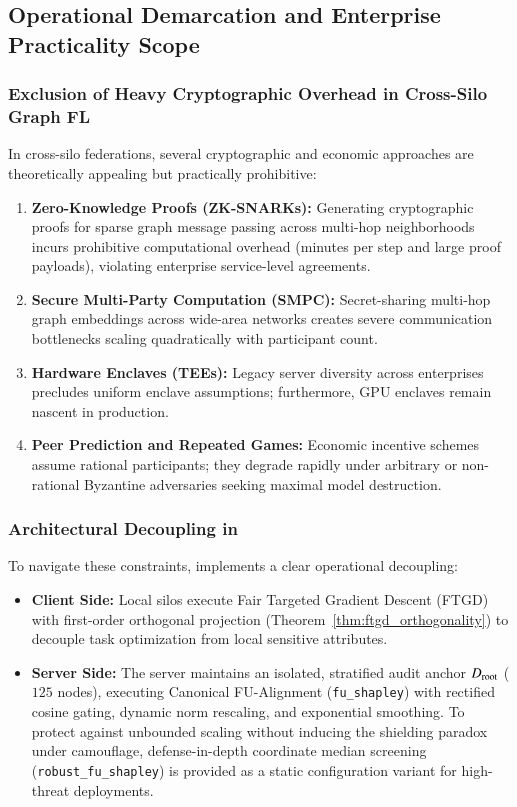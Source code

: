 \subsection{Operational Demarcation and Enterprise Practicality Scope}
\label{subsec:rw_scope}

\subsubsection{Exclusion of Heavy Cryptographic Overhead in Cross-Silo Graph FL}
In cross-silo federations, several cryptographic and economic approaches are theoretically appealing but practically prohibitive:
\begin{enumerate}[leftmargin=*]
    \item \textbf{Zero-Knowledge Proofs (ZK-SNARKs):} Generating cryptographic proofs for sparse graph message passing across multi-hop neighborhoods incurs prohibitive computational overhead (minutes per step and large proof payloads), violating enterprise service-level agreements.
    \item \textbf{Secure Multi-Party Computation (SMPC):} Secret-sharing multi-hop graph embeddings across wide-area networks creates severe communication bottlenecks scaling quadratically with participant count.
    \item \textbf{Hardware Enclaves (TEEs):} Legacy server diversity across enterprises precludes uniform enclave assumptions; furthermore, GPU enclaves remain nascent in production.
    \item \textbf{Peer Prediction and Repeated Games:} Economic incentive schemes assume rational participants; they degrade rapidly under arbitrary or non-rational Byzantine adversaries seeking maximal model destruction.
\end{enumerate}

\subsubsection{Architectural Decoupling in \MethodName{}}
To navigate these constraints, \MethodName{} implements a clear operational decoupling:
\begin{itemize}[leftmargin=*]
    \item \textbf{Client Side:} Local silos execute Fair Targeted Gradient Descent (FTGD) with first-order orthogonal projection (Theorem~\ref{thm:ftgd_orthogonality}) to decouple task optimization from local sensitive attributes.
    \item \textbf{Server Side:} The server maintains an isolated, stratified audit anchor $D_{\mathrm{root}}$ ($125$ nodes), executing Canonical FU-Alignment (\texttt{fu\_shapley}) with rectified cosine gating, dynamic norm rescaling, and exponential smoothing. To protect against unbounded scaling without inducing the shielding paradox under camouflage, defense-in-depth coordinate median screening (\texttt{robust\_fu\_shapley}) is provided as a static configuration variant for high-threat deployments.
\end{itemize}

